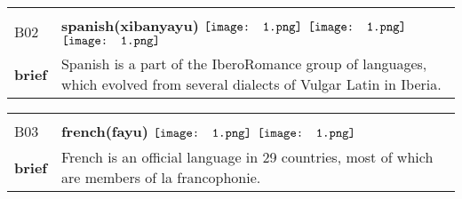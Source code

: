 \documentclass[UTF8]{article}
\begin{document}
            \begin{tabularx}{\textwidth}{p{1.5cm}X}
            \arrayrulecolor{myBlue}
        	\hline\\
            \small{B02}&
            \large{\bfseries{spanish(xibanyayu)}}\hfill
                                                            \phantom{$\vcenter{\hbox{\texttt{[image: 1.png]}}}$}
                                                                \phantom{$\vcenter{\hbox{\texttt{[image: 1.png]}}}$}
                                                                $\vcenter{\hbox{\texttt{[image: 1.png]}}}$
                                                                $\vcenter{\hbox{\texttt{[image: 1.png]}}}$
                                                                \phantom{$\vcenter{\hbox{\texttt{[image: 1.png]}}}$}
                                                                $\vcenter{\hbox{\texttt{[image: 1.png]}}}$
                                                                \phantom{$\vcenter{\hbox{\texttt{[image: 1.png]}}}$}
                                        \\[10pt]
            \large{\bfseries{brief}}&\noindent\parbox[c]{\hsize}{Spanish is a part of the IberoRomance group of languages, which evolved from several dialects of Vulgar Latin in Iberia.} \\[5pt]
            \hline\\[-10pt]
        \end{tabularx}
            \begin{tabularx}{\textwidth}{p{1.5cm}X}
            \arrayrulecolor{myBlue}
        	\hline\\
            \small{B03}&
            \large{\bfseries{french(fayu)}}\hfill
                                                            \phantom{$\vcenter{\hbox{\texttt{[image: 1.png]}}}$}
                                                                \phantom{$\vcenter{\hbox{\texttt{[image: 1.png]}}}$}
                                                                $\vcenter{\hbox{\texttt{[image: 1.png]}}}$
                                                                \phantom{$\vcenter{\hbox{\texttt{[image: 1.png]}}}$}
                                                                \phantom{$\vcenter{\hbox{\texttt{[image: 1.png]}}}$}
                                                                $\vcenter{\hbox{\texttt{[image: 1.png]}}}$
                                                                \phantom{$\vcenter{\hbox{\texttt{[image: 1.png]}}}$}
                                        \\[10pt]
            \large{\bfseries{brief}}&\noindent\parbox[c]{\hsize}{French is an official language in 29 countries, most of which are members of la francophonie.} \\[5pt]
            \hline\\[-10pt]
        \end{tabularx}
\end{document}
